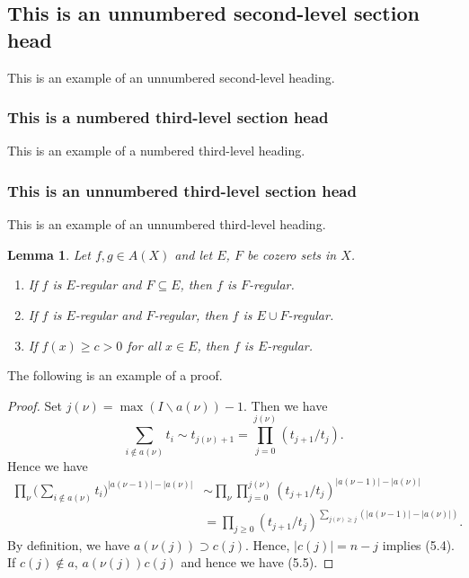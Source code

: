 \documentclass{amsart}
\newtheorem{lemma}[theorem]{Lemma}
\theoremstyle{definition}
\theoremstyle{remark}
\numberwithin{equation}{section}
\newcommand{\abs}[1]{\lvert#1\rvert}
\begin{document}
\subsection*{This is an unnumbered second-level section head}
This is an example of an unnumbered second-level heading.

\subsubsection{This is a numbered third-level section head}
This is an example of a numbered third-level heading.

\subsubsection*{This is an unnumbered third-level section head}
This is an example of an unnumbered third-level heading.

\begin{lemma}
Let $f, g\in  A(X)$ and let $E$, $F$ be cozero
sets in $X$.
\begin{enumerate}
\item If $f$ is $E$-regular and $F\subseteq E$, then $f$ is $F$-regular.

\item If $f$ is $E$-regular and $F$-regular, then $f$ is $E\cup
F$-regular.

\item If $f(x)\ge c>0$ for all $x\in E$, then $f$ is $E$-regular.

\end{enumerate}
\end{lemma}

The following is an example of a proof.

\begin{proof} Set $j(\nu)=\max(I\backslash a(\nu))-1$. Then we have
\[
\sum_{i\notin a(\nu)}t_i\sim t_{j(\nu)+1}
  =\prod^{j(\nu)}_{j=0}(t_{j+1}/t_j).
\]
Hence we have
\begin{equation}
\begin{split}
\prod_\nu\biggl(\sum_{i\notin
  a(\nu)}t_i\biggr)^{\abs{a(\nu-1)}-\abs{a(\nu)}}
&\sim\prod_\nu\prod^{j(\nu)}_{j=0}
  (t_{j+1}/t_j)^{\abs{a(\nu-1)}-\abs{a(\nu)}}\\
&=\prod_{j\ge 0}(t_{j+1}/t_j)^{
  \sum_{j(\nu)\ge j}(\abs{a(\nu-1)}-\abs{a(\nu)})}.
\end{split}
\end{equation}
By definition, we have $a(\nu(j))\supset c(j)$. Hence, $\abs{c(j)}=n-j$
implies (5.4). If $c(j)\notin a$, $a(\nu(j))c(j)$ and hence
we have (5.5).
\end{proof}
\end{document}
